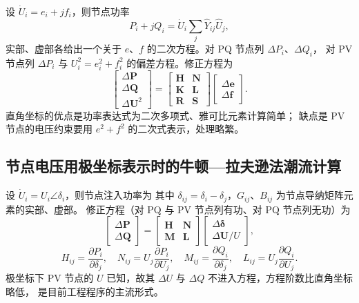 设 $\dot U_i=e_i+jf_i$，则节点功率
\begin{equation}
  P_i+jQ_i=\dot U_i\sum_{j}\hat Y_{ij}\hat U_j ,
\end{equation}
实部、虚部各给出一个关于 $e$、$f$ 的二次方程。对 PQ 节点列 $\Delta P_i$、$\Delta Q_i$，
对 PV 节点列 $\Delta P_i$ 与 $U_i^{2}=e_i^{2}+f_i^{2}$ 的偏差方程。修正方程为
\begin{equation}
  \begin{bmatrix}\Delta\boldsymbol P\\ \Delta\boldsymbol Q\\ \Delta\boldsymbol U^{2}\end{bmatrix}
  =\begin{bmatrix}
    \boldsymbol H & \boldsymbol N\\
    \boldsymbol K & \boldsymbol L\\
    \boldsymbol R & \boldsymbol S
  \end{bmatrix}
  \begin{bmatrix}\Delta\boldsymbol e\\ \Delta\boldsymbol f\end{bmatrix}.
\end{equation}
直角坐标的优点是功率表达式为二次多项式、雅可比元素计算简单；
缺点是 PV 节点的电压约束要用 $e^{2}+f^{2}$ 的二次式表示，处理略繁。

\subsection{节点电压用极坐标表示时的牛顿—拉夫逊法潮流计算}

设 $\dot U_i=U_i\angle\delta_i$，则节点注入功率为
其中 $\delta_{ij}=\delta_i-\delta_j$，$G_{ij}$、$B_{ij}$ 为节点导纳矩阵元素的实部、虚部。
修正方程（对 PQ 与 PV 节点列有功、对 PQ 节点列无功）为
\begin{equation}
  \begin{bmatrix}\Delta\boldsymbol P\\ \Delta\boldsymbol Q\end{bmatrix}
  =\begin{bmatrix}\boldsymbol H & \boldsymbol N\\ \boldsymbol M & \boldsymbol L\end{bmatrix}
  \begin{bmatrix}\Delta\boldsymbol\delta\\ \Delta\boldsymbol U/U\end{bmatrix},
\end{equation}
\begin{equation}
  H_{ij}=\frac{\partial P_i}{\partial\delta_j},\quad
  N_{ij}=U_j\frac{\partial P_i}{\partial U_j},\quad
  M_{ij}=\frac{\partial Q_i}{\partial\delta_j},\quad
  L_{ij}=U_j\frac{\partial Q_i}{\partial U_j}.
\end{equation}
极坐标下 PV 节点的 $U$ 已知，故其 $\Delta U$ 与 $\Delta Q$ 不进入方程，方程阶数比直角坐标略低，
是目前工程程序的主流形式。

